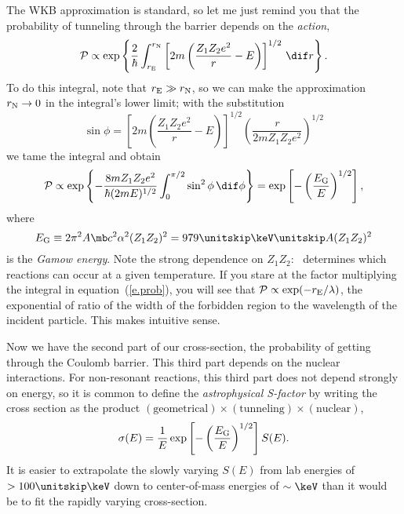 The WKB approximation is standard, so let me just remind you that the probability of tunneling through the barrier depends on the \emph{action},
\begin{equation}\label{e.wkb}
\mathcal{P} \propto \exp\left\{\frac{2}{\hbar}\int_{\re}^{\rn}\left[2m\left(\frac{Z_{1}Z_{2}e^{2}}{r}-E\right) \right]^{1/2}\,\dif r\right\}.
\end{equation}
To do this integral, note that $r_{\mathrm{E}}\gg r_{\mathrm{N}}$, so we can make the approximation $r_{\mathrm{N}}\to 0$ in the integral's lower limit; with the substitution
\[
\sin\phi = \left[2m\left(\frac{Z_{1}Z_{2}e^{2}}{r}-E\right) \right]^{1/2} 
	\left(\frac{r}{2mZ_{1}Z_{2}e^{2}}\right)^{1/2}
\]
we tame the integral and obtain
\begin{equation}\label{e.prob}
\mathcal{P} \propto \exp\left\{-\frac{8mZ_{1}Z_{2}e^{2}}{\hbar(2mE)^{1/2}}\int_{0}^{\pi/2}\sin^{2}\phi\,\dif\phi\right\} = \exp\left[-\left(\frac{\EG}{E}\right)^{1/2}\right],
\end{equation}
where
\begin{equation}\label{e.EGamow}
\EG\equiv 2\pi^{2} A \mb c^{2} \alpha^{2} (Z_{1}Z_{2})^{2} = 979\nsp\keV \nsp A (Z_{1}Z_{2})^{2}
\end{equation}
is the \emph{Gamow energy}.  Note the strong dependence on $Z_{1}Z_{2}$: \EG\ determines which reactions can occur at a given temperature. If you stare at the factor multiplying the integral in equation~(\ref{e.prob}), you will see that $\mathcal{P}\propto \exp(-r_{\mathrm{E}}/\lambda)$, the exponential of ratio of the width of the forbidden region to the wavelength of the incident particle. This makes intuitive sense.

Now we have the second part of our cross-section, the probability of getting through the Coulomb barrier.  This third part depends on the nuclear interactions.  For non-resonant reactions, this third part does not depend strongly on energy, so it is common to define the \emph{astrophysical S-factor} by writing the cross section as the product $(\textrm{geometrical})\times(\textrm{tunneling})\times(\textrm{nuclear})$, 
\begin{equation}\label{e.s-def}
\sigma(E) = \frac{1}{E}\exp\left[-\left(\frac{E_{\mathrm{G}}}{E}\right)^{1/2}\right] S(E).
\end{equation}
It is easier to extrapolate the slowly varying $S(E)$ from lab energies of $> 100\nsp\keV$ down to center-of-mass energies of $\sim \keV$ than it would be to fit the rapidly varying cross-section.

